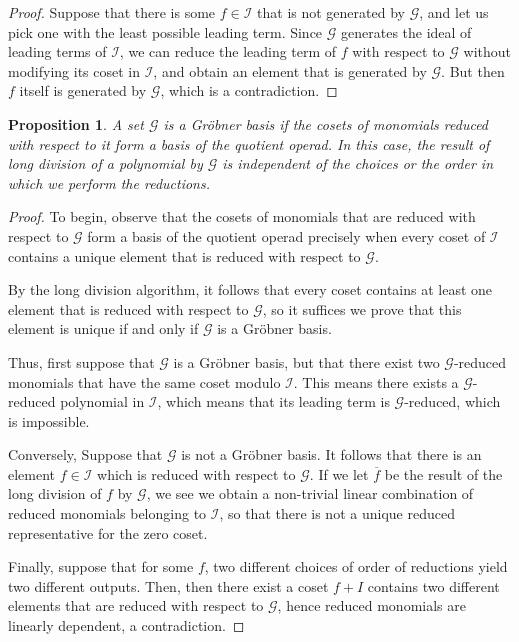 \documentclass[fleqn, a4paper, twoside]{article}
\newcommand{\0}{\langle 0\rangle}
\newcommand{\GG}{\mathcal G}
\DeclareRobustCommand{\[}{\begin{equation}}%
\DeclareRobustCommand{\]}{\end{equation}}%
\theoremstyle{mytheorem}
\newtheorem{proposition}[theorem]{Proposition}
\theoremstyle{introthm}
\theoremstyle{mydefinition}
\theoremstyle{mydefinition2}
\theoremstyle{plain} %
\newcommand{\?}{\,?\,}
\theoremstyle{mytheorem}
\theoremstyle{plain} %
\begin{document}
\begin{proof}
Suppose that there is some $f\in \mathcal I$ that is not
generated by $\mathcal G$, and let us pick one with the least 
possible leading term. Since $\mathcal G$ generates the
ideal of leading terms of $\mathcal I$, we can reduce
the leading term of $f$ with respect to $\mathcal G$
without modifying its coset in $\mathcal I$,
and obtain an element that is generated by $\mathcal G$.
But then $f$ itself is generated by $\mathcal G$,
which is a contradiction.
\end{proof}


\begin{proposition}
A set $\mathcal G$ is a Gr\"obner basis if the cosets of monomials
reduced with respect to it form a basis of the quotient operad. 
In this case, the result of long division of a polynomial by
$\mathcal G$ is independent of the choices or the order in
 which we perform the reductions. 
\end{proposition}

\begin{proof}
To begin, observe that 
the cosets of monomials that are reduced with respect
to $\mathcal G$ form a basis of the quotient operad precisely
when every coset of $\mathcal I$ contains a unique element
that is reduced with respect to $\mathcal G$. 

By the long division algorithm, it follows that every coset
contains at least one element that is reduced with respect to $\mathcal G$,
so it suffices we prove that this element is unique if and only if
$\mathcal G$ is a Gr\"obner basis.

Thus, first suppose that $\mathcal G$ is a Gr\"obner basis, but that
there exist two $\mathcal G$-reduced monomials that have the same
coset modulo $\mathcal I$. This means there exists a $\mathcal G$-reduced 
polynomial in $\mathcal I$, which means that its leading term is
$\mathcal G$-reduced, which is impossible.

Conversely, Suppose that $\mathcal G$ is not a Gröbner basis. It follows
that there is an element $f\in\mathcal I$ which is reduced with respect to 
$\mathcal G$. If we let $\overline{f}$ be the result of the long division of
$f$ by $\mathcal G$, we see we obtain a non-trivial linear combination of reduced 
monomials belonging to $\mathcal I$, so that there is not a unique
reduced representative for the zero coset.

Finally, suppose that for some $f$, two different choices of order of reductions yield two different outputs. Then, then there exist a coset $f + I$ contains two different elements that are reduced with respect to $\GG$, hence reduced monomials are linearly dependent, a contradiction.
\end{proof}
\end{document}
